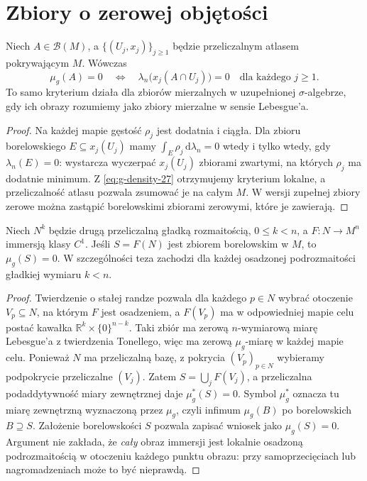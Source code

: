 \section{Zbiory o zerowej objętości}
\begin{twierdzenie}
\label{thm:null-local-27}
Niech $A\in\mathcal B(M)$, a
$\{(U_j,x_j)\}_{j\ge1}$ będzie przeliczalnym atlasem
pokrywającym $M$. Wówczas
\[
 \mu_g(A)=0\quad\Longleftrightarrow\quad
 \lambda_n\bigl(x_j(A\cap U_j)\bigr)=0
 \quad\text{dla każdego }j\ge1.
\]
To samo kryterium działa dla zbiorów mierzalnych
w uzupełnionej $\sigma$-algebrze, gdy ich obrazy
rozumiemy jako zbiory mierzalne w sensie Lebesgue'a.
\end{twierdzenie}
\begin{proof}
Na każdej mapie gęstość $\rho_j$ jest dodatnia
i ciągła. Dla zbioru borelowskiego $E\subseteq x_j(U_j)$
mamy $\int_E\rho_j\,\mathrm d\lambda_n=0$
wtedy i tylko wtedy, gdy $\lambda_n(E)=0$:
wystarcza wyczerpać $x_j(U_j)$ zbiorami zwartymi,
na których $\rho_j$ ma dodatnie minimum.
Z \eqref{eq:g-density-27} otrzymujemy kryterium
lokalne, a przeliczalność atlasu pozwala
zsumować je na całym $M$. W wersji zupełnej
zbiory zerowe można zastąpić borelowskimi
zbiorami zerowymi, które je zawierają.
\end{proof}

\begin{wniosek}
\label{cor:submanifold-null-27}
Niech $N^k$ będzie drugą przeliczalną gładką
rozmaitością, $0\le k<n$, a $F:N\to M^n$
immersją klasy $C^1$. Jeśli $S=F(N)$ jest
zbiorem borelowskim w $M$, to $\mu_g(S)=0$.
W szczególności teza zachodzi dla każdej osadzonej
podrozmaitości gładkiej wymiaru $k<n$.
\end{wniosek}
\begin{proof}
Twierdzenie o stałej randze pozwala dla każdego
$p\in N$ wybrać otoczenie $V_p\subseteq N$,
na którym $F$ jest osadzeniem, a $F(V_p)$
ma w odpowiedniej mapie celu postać kawałka
$\mathbb R^k\times\{0\}^{n-k}$.
Taki zbiór ma zerową $n$-wymiarową miarę
Lebesgue'a z twierdzenia Tonellego, więc
ma zerową $\mu_g$-miarę w każdej mapie celu.
Ponieważ $N$ ma przeliczalną bazę, z pokrycia
$(V_p)_{p\in N}$ wybieramy podpokrycie
przeliczalne $(V_j)$. Zatem
$S=\bigcup_jF(V_j)$, a przeliczalna
podaddytywność miary zewnętrznej daje
$\mu_g^*(S)=0$. Symbol $\mu_g^*$ oznacza tu miarę
zewnętrzną wyznaczoną przez $\mu_g$, czyli infimum
$\mu_g(B)$ po borelowskich $B\supseteq S$. Założenie borelowskości $S$
pozwala zapisać wniosek jako $\mu_g(S)=0$.
Argument nie zakłada, że \emph{cały} obraz immersji
jest lokalnie osadzoną podrozmaitością w otoczeniu
każdego punktu obrazu: przy samoprzecięciach lub
nagromadzeniach może to być nieprawdą.
\end{proof}

